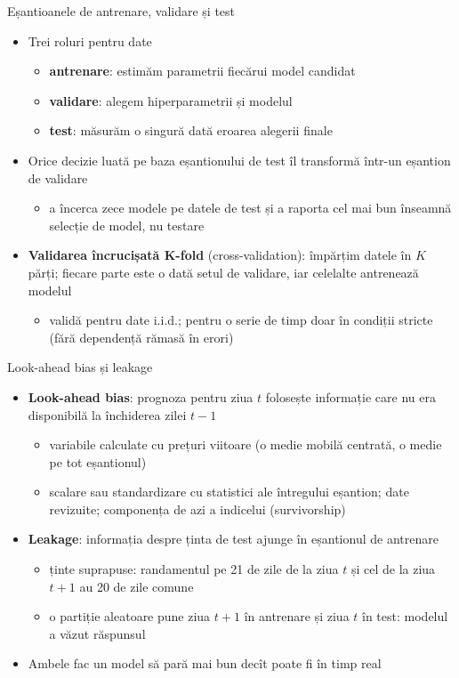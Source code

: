 \begin{frame}{Eșantioanele de antrenare, validare și test}
\itemsize{\small}
\begin{itemize}
    \item Trei roluri pentru date
    \begin{itemize}
        \item \textbf{antrenare}: estimăm parametrii fiecărui model candidat
        \item \textbf{validare}: alegem hiperparametrii și modelul
        \item \textbf{test}: măsurăm o singură dată eroarea alegerii finale
    \end{itemize}
    \item Orice decizie luată pe baza eșantionului de test îl transformă într-un eșantion de validare
    \begin{itemize}
        \item a încerca zece modele pe datele de test și a raporta cel mai bun înseamnă selecție de model, nu testare
    \end{itemize}
    \item \textbf{Validarea încrucișată K-fold} (cross-validation): împărțim datele în $K$ părți; fiecare parte este o dată setul de validare, iar celelalte antrenează modelul
    \begin{itemize}
        \item validă pentru date i.i.d.; pentru o serie de timp doar în condiții stricte (fără dependență rămasă în erori) 
    \end{itemize}
\end{itemize}
\end{frame}

\begin{frame}{Look-ahead bias și leakage}
\itemsize{\small}
\begin{itemize}
    \item \textbf{Look-ahead bias}: prognoza pentru ziua $t$ folosește informație care nu era disponibilă la închiderea zilei $t - 1$
    \begin{itemize}
        \item variabile calculate cu prețuri viitoare (o medie mobilă centrată, o medie pe tot eșantionul)
        \item scalare sau standardizare cu statistici ale întregului eșantion; date revizuite; componența de azi a indicelui (survivorship)
    \end{itemize}
    \item \textbf{Leakage}: informația despre ținta de test ajunge în eșantionul de antrenare
    \begin{itemize}
        \item ținte suprapuse: randamentul pe 21 de zile de la ziua $t$ și cel de la ziua $t + 1$ au 20 de zile comune
        \item o partiție aleatoare pune ziua $t + 1$ în antrenare și ziua $t$ în test: modelul a văzut răspunsul
    \end{itemize}
    \item Ambele fac un model să pară mai bun decît poate fi în timp real
\end{itemize}
\end{frame}

